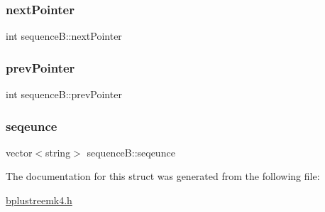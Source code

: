 \subsubsection{\texorpdfstring{next\+Pointer}{nextPointer}}
{\footnotesize\ttfamily int sequence\+B\+::next\+Pointer}

\mbox{\label{structsequence_b_a283d04c17687640e735e6fc5dc444f50}} 
\subsubsection{\texorpdfstring{prev\+Pointer}{prevPointer}}
{\footnotesize\ttfamily int sequence\+B\+::prev\+Pointer}

\mbox{\label{structsequence_b_a4cb5526b3901d3a3348447bee4e7f623}} 
\subsubsection{\texorpdfstring{seqeunce}{seqeunce}}
{\footnotesize\ttfamily vector$<$string$>$ sequence\+B\+::seqeunce}



The documentation for this struct was generated from the following file\+:\begin{DoxyCompactItemize}
\item 
\mbox{\hyperlink{bplustreemk4_8h}{bplustreemk4.\+h}}\end{DoxyCompactItemize}
